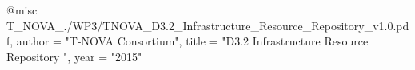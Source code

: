 @misc{ T_NOVA_./WP3/TNOVA_D3.2_Infrastructure_Resource_Repository_v1.0.pdf,
       author = "T-NOVA Consortium",
       title = "D3.2 Infrastructure Resource Repository ",
       year = "2015" }
